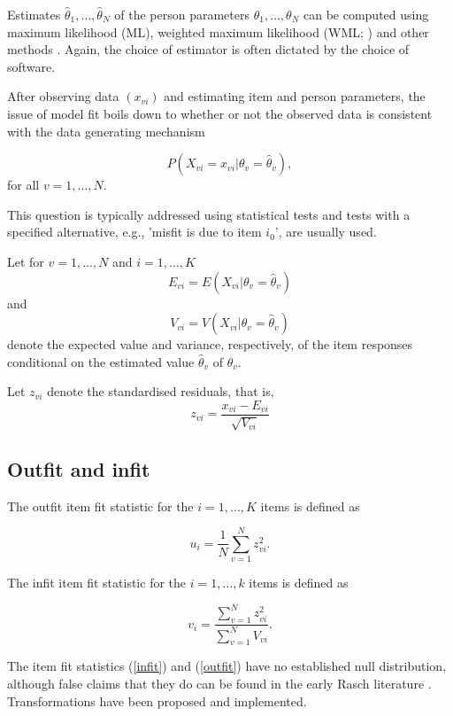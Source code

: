 \documentclass[11pt,a4paper]{article}
\begin{document}
Estimates $\hat\theta_1,\ldots,\hat\theta_N$ of the person parameters $\theta_1,\ldots,\theta_N$ can be computed using maximum likelihood (ML), weighted maximum likelihood (WML; ) and other methods \cite{Kreiner-Christensen-2013}. Again, the choice of estimator is often dictated by the choice of software.

After observing data $(x_{vi})$ and estimating item and person parameters, the issue of model fit boils down to whether or not the observed data is consistent with the data generating mechanism

\begin{equation}
\label{IRThat}
P(X_{vi}=x_{vi}|\theta_v=\hat\theta_v),
\end{equation}
for all $v = 1,\ldots,N$.

This question is typically addressed using statistical tests and tests with a specified alternative, e.g., 'misfit is due to item $i_0$', are usually used.

Let for $v=1,\ldots,N$ and $i=1,\ldots,K$
$$
E_{vi} = E(X_{vi} | \theta_v = \hat\theta_v)
$$ 
and 
$$
V_{vi} = V(X_{vi} | \theta_v = \hat\theta_v)
$$
denote the expected value and variance, respectively, of the item responses conditional on the estimated value $\hat\theta_v$ of $\theta_v$.

Let $z_{vi}$ denote the standardised residuals, that is,
$$
z_{vi} = \frac{x_{vi} - E_{vi}}{\sqrt{V_{vi}}}
$$

\subsection{Outfit and infit}
\label{sec:fit-stat}

The outfit item fit statistic for the $i=1,\ldots,K$ items is defined as

\begin{equation}
u_i = \frac1N\sum_{v=1}^N z_{vi}^2.
\label{outfit}
\end{equation}

The infit item fit statistic for the $i=1,\ldots,k$ items is defined as

\begin{equation}
v_i = \frac{\sum_{v=1}^Nz_{vi}^2}{\sum_{v = 1}^N V_{vi}}.
\label{infit}    
\end{equation}

The item fit statistics (\ref{infit}) and (\ref{outfit}) have no established null distribution, although false claims that they do can be found in the early Rasch literature \cite{Wright-Panchapakesan-1969,Wright-Stone-1979}. Transformations have been proposed and implemented.
\end{document}
